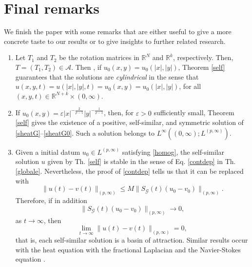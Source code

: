 \documentclass[12pt]{amsart}
\newcommand{\R}{\mathbb{R}}
\begin{document}
\section{Final remarks}

We finish the paper with some remarks that are either useful to give a more concrete taste to our results or to give insights to further related research.


\begin{enumerate}
	\item[(a)] Let $T_1$ and $T_2$ be the rotation matrices in $\R^N$ and $\R^k$, respectively. Then, $T=(T_1,T_2)\in\mathcal{A}$. Then , if $u_0(x,y) = u_0(|x|,|y|)$, Theorem \ref{self} guarantees that the solutions are \textit{cylindrical} in the sense that $u(x,y,t) = u(|x|,|y|,t) = u_0(x,y) = u_0(|x|,|y|)$, for all $(x,y,t)\in \R^{N+k}\times(0,\infty)$. 
	
	\item[(b)] If $u_0(x,y) = \varepsilon|x|^{-\frac{2}{\rho-1}} |y|^{-\frac{1}{\rho-1}}$, then, for $\varepsilon>0$ sufficiently small, Theorem \ref{self} gives the existence of a positive, self-similar, and symmetric solution of \eqref{sheatG}--\eqref{sheatG0}. Such a solution belongs to $L^\infty((0,\infty);L^{(p,\infty)})$.
	
	
	\item[(c)] Given a initial datum $u_0 \in L^{(p,\infty)}$ satisfying \eqref{homog}, the self-similar solution $u$ given by Th. \ref{self} is stable in the sense of Eq. \eqref{contdep} in Th. \ref{globale}. Nevertheless, the proof of \eqref{contdep} tells us that it can be replaced with
	\begin{equation}
		\|u(t) - v(t)\|_{(p,\infty)} \leq M \|S_{\mathcal{G}}(t)\left( u_0 - v_0 \right) \|_{(p,\infty)} .
	\end{equation}
	Therefore, if in addition 
	$$\|S_{\mathcal{G}}(t)\left( u_0 - v_0 \right) \|_{(p,\infty)} \rightarrow 0,$$
	as $t\rightarrow\infty$, then 
	\begin{equation}
		\lim_{t\rightarrow\infty} \|u(t) - v(t)\|_{(p,\infty)} =0,
	\end{equation}
	that is, each self-similar solution is a basin of attraction. Similar results occur with the heat equation with the fractional Laplacian \cite{FVR} and the Navier-Stokes equation \cite{Can-Kar-05}.
	

\end{enumerate}
\end{document}
